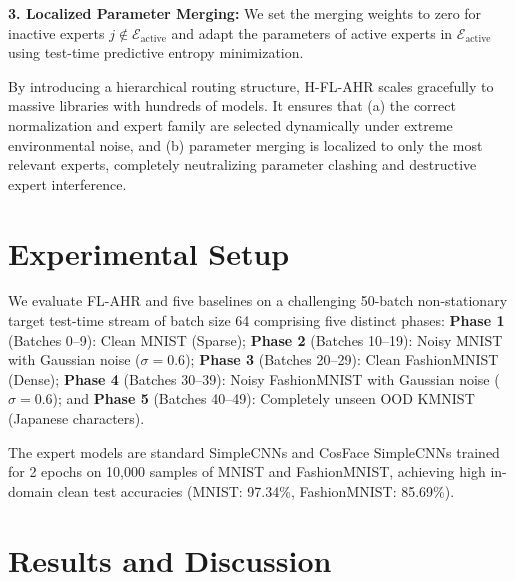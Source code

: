 \documentclass{article}
\theoremstyle{plain}
\theoremstyle{definition}
\theoremstyle{remark}
\begin{document}
\textbf{3. Localized Parameter Merging:} We set the merging weights to zero for inactive experts $j \notin \mathcal{E}_{\text{active}}$ and adapt the parameters of active experts in $\mathcal{E}_{\text{active}}$ using test-time predictive entropy minimization.

By introducing a hierarchical routing structure, H-FL-AHR scales gracefully to massive libraries with hundreds of models. It ensures that (a) the correct normalization and expert family are selected dynamically under extreme environmental noise, and (b) parameter merging is localized to only the most relevant experts, completely neutralizing parameter clashing and destructive expert interference.

\section{Experimental Setup}
\label{submission-experiment}

We evaluate FL-AHR and five baselines \cite{gong2025adaptive, song2023ecotta} on a challenging 50-batch non-stationary target test-time stream of batch size 64 comprising five distinct phases: \textbf{Phase 1} (Batches 0--9): Clean MNIST (Sparse); \textbf{Phase 2} (Batches 10--19): Noisy MNIST with Gaussian noise ($\sigma = 0.6$); \textbf{Phase 3} (Batches 20--29): Clean FashionMNIST (Dense); \textbf{Phase 4} (Batches 30--39): Noisy FashionMNIST with Gaussian noise ($\sigma = 0.6$); and \textbf{Phase 5} (Batches 40--49): Completely unseen OOD KMNIST (Japanese characters).

The expert models are standard SimpleCNNs and CosFace SimpleCNNs trained for 2 epochs on 10,000 samples of MNIST and FashionMNIST, achieving high in-domain clean test accuracies (MNIST: 97.34\%, FashionMNIST: 85.69\%).

\section{Results and Discussion}
\label{submission-results}
\end{document}
